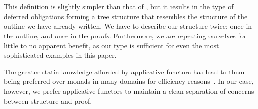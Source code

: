 \documentclass[sigplan]{acmart}%
\begin{document}
 \begin{code}
  \>[2]\AgdaSpace{}%
  \AgdaSymbol{:}\AgdaSpace{}%
  \AgdaSpace{}%
  \AgdaSymbol{(}\AgdaSpace{}%
  \AgdaSymbol{)}\AgdaSpace{}%
  \AgdaSpace{}%
  \AgdaSpace{}%
  \<%
  \\
  \>[2]\AgdaSpace{}%
  \AgdaSpace{}%
  \AgdaSymbol{=}%
  \>[79I]\AgdaSpace{}%
  \AgdaSymbol{(}\AgdaSpace{}%
  \AgdaSymbol{(}\AgdaSpace{}%
  \AgdaSymbol{)}\AgdaSpace{}%
  \AgdaSymbol{(}\AgdaSpace{}%
  \AgdaSpace{}%
  \AgdaSpace{}%
  \AgdaSymbol{))}\<%
  \\
  \>[79I][@{}l@{\AgdaIndent{0}}]%
  \>[12]\AgdaSpace{}%
  \AgdaSymbol{\{}\AgdaSpace{}%
  \AgdaSymbol{(}\AgdaSpace{}%
  \AgdaOperator{\AgdaInductiveConstructor{,}}\AgdaSpace{}%
  \AgdaSymbol{)}\AgdaSpace{}%
  \>[28]\AgdaSpace{}%
  \AgdaSymbol{(}\AgdaSpace{}%
  \AgdaSpace{}%
  \AgdaSymbol{)}\AgdaSpace{}%
  \AgdaSpace{}%
  \AgdaSymbol{\}}\<%
  \end{code}
This definition is slightly simpler than that of , but it results in the type of deferred obligations 
forming a tree structure that resembles the structure of the outline we have already written. We have to describe 
our structure twice: once in the outline, and once in the proofs.  Furthermore, we are repeating ourselves for little to 
no apparent benefit, as our  type is sufficient for even the most sophisticated examples in this paper.

The greater static knowledge afforded by applicative functors has lead to them being preferred 
over monads in many domains for efficiency reasons~\citep{tyde16,haxl,haxl2,applicativedo}. In our case, however,
we prefer applicative functors to maintain a clean separation of concerns 
between structure and proof.
\end{document}
